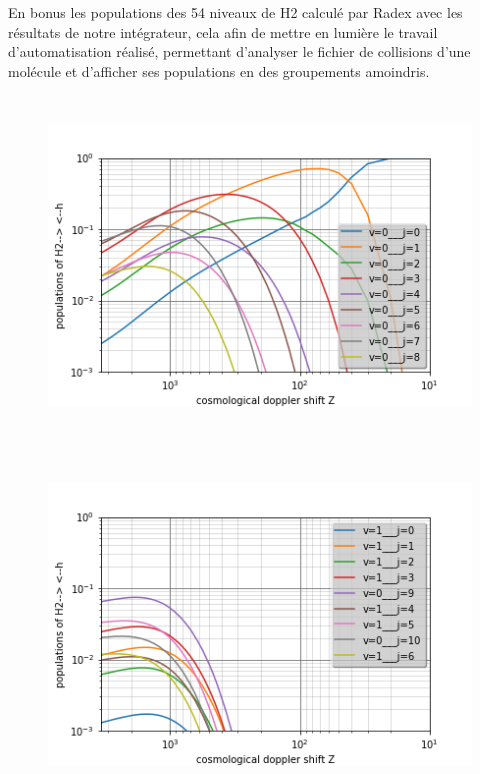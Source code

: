 \documentclass[10pt, a4paper]{report}
\numberwithin{equation}{subsection}
\begin{document}
En bonus les populations des 54 niveaux de H2 calculé par Radex avec les résultats de notre intégrateur, cela afin de mettre en lumière le travail d'automatisation réalisé, permettant d'analyser le fichier de collisions d'une molécule et d'afficher ses populations en des groupements amoindris.
\begin{figure}[]
\centering
\includegraphics[width=14.0cm,height=9cm]{levelsh2-h.0.png}
\end{figure}
\begin{figure}[]
\centering
\includegraphics[width=14.0cm,height=9cm]{levelsh2-h.1.png}
\end{figure}
\end{document}
